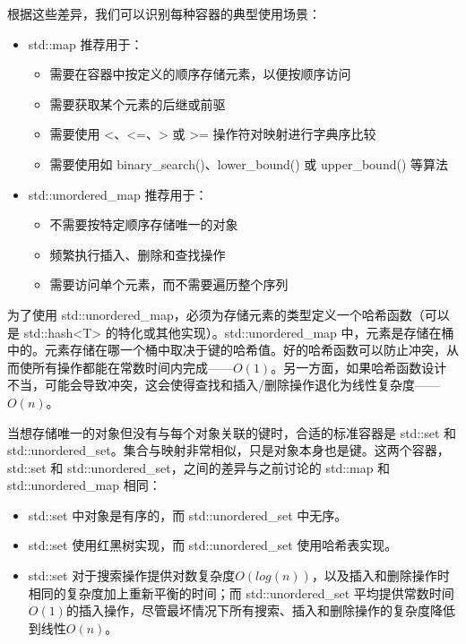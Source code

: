 根据这些差异，我们可以识别每种容器的典型使用场景：

\begin{itemize}
\item
std::map 推荐用于：

\begin{itemize}
\item
需要在容器中按定义的顺序存储元素，以便按顺序访问

\item
需要获取某个元素的后继或前驱

\item
需要使用 <、<=、> 或 >= 操作符对映射进行字典序比较

\item
需要使用如 binary\_search()、lower\_bound() 或 upper\_bound() 等算法
\end{itemize}

\item
std::unordered\_map 推荐用于：

\begin{itemize}
\item
不需要按特定顺序存储唯一的对象

\item
频繁执行插入、删除和查找操作

\item
需要访问单个元素，而不需要遍历整个序列
\end{itemize}
\end{itemize}

为了使用 std::unordered\_map，必须为存储元素的类型定义一个哈希函数（可以是 std::hash<T> 的特化或其他实现）。std::unordered\_map 中，元素是存储在桶中的。元素存储在哪一个桶中取决于键的哈希值。好的哈希函数可以防止冲突，从而使所有操作都能在常数时间内完成——$O(1)$。另一方面，如果哈希函数设计不当，可能会导致冲突，这会使得查找和插入/删除操作退化为线性复杂度——$O(n)$。

当想存储唯一的对象但没有与每个对象关联的键时，合适的标准容器是 std::set 和 std::unordered\_set。集合与映射非常相似，只是对象本身也是键。这两个容器，std::set 和 std::unordered\_set，之间的差异与之前讨论的 std::map 和 std::unordered\_map 相同：

\begin{itemize}
\item
std::set 中对象是有序的，而 std::unordered\_set 中无序。

\item
std::set 使用红黑树实现，而 std::unordered\_set 使用哈希表实现。

\item
std::set 对于搜索操作提供对数复杂度$O(log(n))$，以及插入和删除操作时相同的复杂度加上重新平衡的时间；而 std::unordered\_set 平均提供常数时间$O(1)$的插入操作，尽管最坏情况下所有搜索、插入和删除操作的复杂度降低到线性$O(n)$。
\end{itemize}

